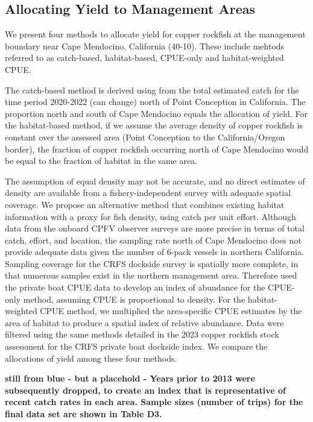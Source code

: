 \documentclass[
  12pt,
  authoryear,
  preprint,
  3p]{elsarticle}
\begin{document}
\hypertarget{allocating-yield-to-management-areas}{%
\subsection{Allocating Yield to Management
Areas}\label{allocating-yield-to-management-areas}}

We present four methods to allocate yield for copper rockfish at the
management boundary near Cape Mendocino, California (40-10). These
include mehtods referred to as catch-based, habitat-based, CPUE-only and
habitat-weighted CPUE.

The catch-based method is derived using from the total estimated catch
for the time period 2020-2022 (can change) north of Point Conception in
California. The proportion north and south of Cape Mendocino equals the
allocation of yield. For the habitat-based method, if we assume the
average density of copper rockfish is constant over the assessed area
(Point Conception to the California/Oregon border), the fraction of
copper rockfish occurring north of Cape Mendocino would be equal to the
fraction of habitat in the same area.

The assumption of equal density may not be accurate, and no direct
estimates of density are available from a fishery-independent survey
with adequate spatial coverage. We propose an alternative method that
combines existing habitat information with a proxy for fish density,
using catch per unit effort. Although data from the onboard CPFV
observer surveys are more precise in terms of total catch, effort, and
location, the sampling rate north of Cape Mendocino does not provide
adequate data given the number of 6-pack vessels in northern California.
Sampling coverage for the CRFS dockside survey is spatially more
complete, in that numerous samples exist in the northern management
area. Therefore used the private boat CPUE data to develop an index of
abundance for the CPUE-only method, assuming CPUE is proportional to
density. For the habitat-weighted CPUE method, we multiplied the
area-specific CPUE estimates by the area of habitat to produce a spatial
index of relative abundance. Data were filtered using the same methods
detailed in the 2023 copper rockfish stock assessment for the CRFS
private boat dockside index. We compare the allocations of yield among
these four methods.

\textbf{still from blue - but a placehold - Years prior to 2013 were
subsequently dropped, to create an index that is representative of
recent catch rates in each area. Sample sizes (number of trips) for the
final data set are shown in Table D3. }
\end{document}
